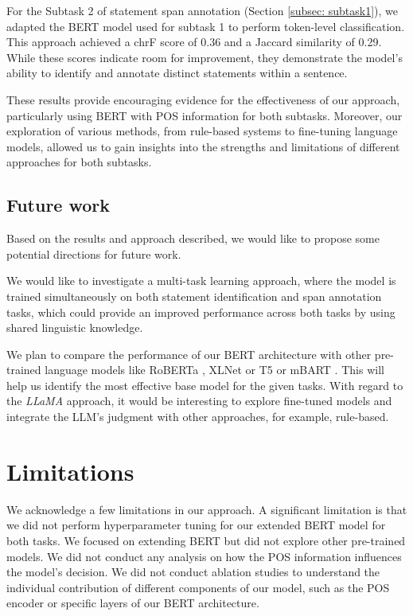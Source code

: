 \documentclass[11pt]{article}
\begin{document}
For the Subtask 2 of statement span annotation (Section \ref{subsec: subtask1}), we adapted the BERT model used for subtask 1 to perform token-level classification. This approach achieved a chrF score of 0.36 and a Jaccard similarity of 0.29. While these scores indicate room for improvement, they demonstrate the model's ability to identify and annotate distinct statements within a sentence.

These results provide encouraging evidence for the effectiveness of our approach, particularly using BERT with POS information for both subtasks. Moreover, our exploration of various methods, from rule-based systems to fine-tuning language models, allowed us to gain insights into the strengths and limitations of different approaches for both subtasks.

\subsection{Future work}\label{subsec: future-work}


Based on the results and approach described, we would like to propose some potential directions for future work. 

We would like to investigate a multi-task learning approach, where the model is trained simultaneously on both statement identification and span annotation tasks, which could provide an improved performance across both tasks by using shared linguistic knowledge.

We plan to compare the performance of our BERT architecture with other pre-trained language models like RoBERTa \citep{liu2019roberta}, XLNet \citep{yang2019xlnet} or T5 \citep{raffel2020exploring} or mBART \citep{liu2020multilingual}. This will help us identify the most effective base model for the given tasks.
With regard to the \textit{LLaMA} approach, it would be interesting to explore fine-tuned models and integrate the LLM's judgment with other approaches, for example, rule-based. 

\section*{Limitations}


We acknowledge a few limitations in our approach. A significant limitation is that we did not perform hyperparameter tuning for our extended BERT model for both tasks. We focused on extending BERT but did not explore other pre-trained models. We did not conduct any analysis on how the POS information influences the model's decision. We did not conduct ablation studies to understand the individual contribution of different components of our model, such as the POS encoder or specific layers of our BERT architecture. 
\end{document}
